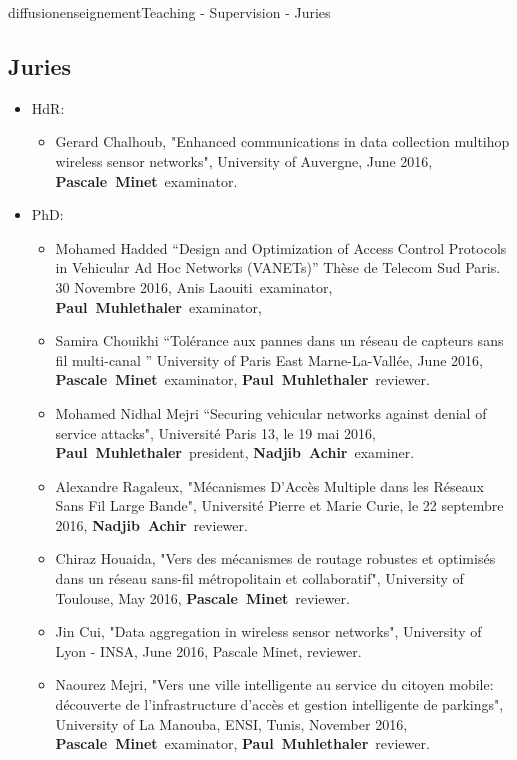 \documentclass{ra2016}
\newcommand{\paul}             {\textbf{Paul~Muhlethaler}}
\newcommand{\pascale}          {\textbf{Pascale~Minet}}
\newcommand{\achir}            {\textbf{Nadjib~Achir}}
\begin{document}
\begin{module}{diffusion}{enseignement}{Teaching - Supervision - Juries}
\subsection {Juries}
\begin{itemize}
    \item HdR: 
        \begin{itemize}
                	\item Gerard Chalhoub,  "Enhanced communications in data collection multihop wireless sensor networks", University of Auvergne, June 2016, \pascale~examinator.
        \end{itemize} 
    \item PhD: 
        \begin{itemize}
      \item Mohamed Hadded  ``Design and Optimization of Access Control Protocols in
Vehicular Ad Hoc Networks (VANETs)'' Th\`ese de Telecom Sud Paris. 30 Novembre 2016, Anis Laouiti~examinator, \paul~examinator, 
             \item   Samira Chouikhi  ``Tolérance aux pannes dans un réseau de capteurs sans fil multi-canal '' University of Paris East Marne-La-Vall\'ee,  June 2016, \pascale~examinator, \paul~reviewer.
             \item Mohamed Nidhal Mejri ``Securing vehicular networks against denial of service attacks", Université Paris 13, le 19 mai 2016,  \paul~president, \achir~examiner.
             \item   Alexandre Ragaleux, "M\'ecanismes D’Acc\`es Multiple dans les R\'eseaux Sans Fil Large Bande", Université Pierre et Marie Curie, le 22 septembre 2016, \achir~reviewer.  
              \item Chiraz Houaida, "Vers des m\'ecanismes de routage robustes et optimis\'es dans un r\'eseau sans-fil m\'etropolitain et collaboratif", University of Toulouse, May 2016, \pascale~reviewer.
             \item Jin Cui, "Data aggregation in wireless sensor networks", University of Lyon - INSA, June 2016, Pascale Minet, reviewer.
		\item Naourez Mejri, "Vers une ville intelligente au service du citoyen mobile: d\'ecouverte de l'infrastructure d'acc\`es et gestion intelligente de parkings", University of La Manouba, ENSI, Tunis, November 2016, \pascale~examinator,  \paul~reviewer.

\end{itemize}
\end{itemize}
\end{module}
\end{document}
